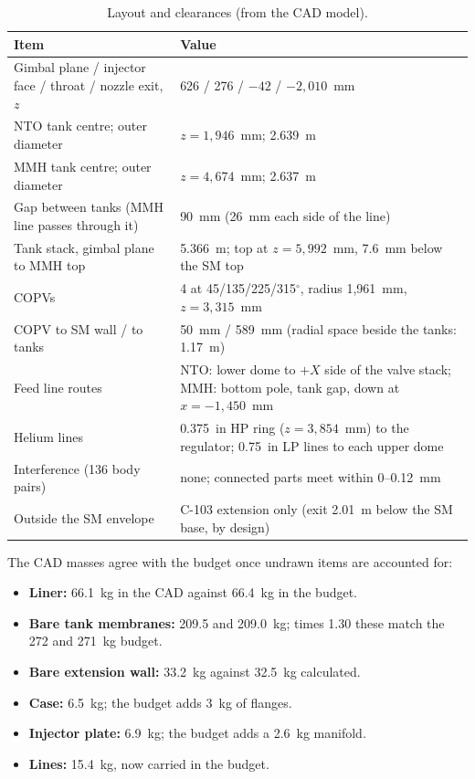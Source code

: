 \documentclass[10pt]{article}
\begin{document}
\begin{table}[H]\centering\small\caption{Layout and clearances (from the CAD model).}\label{tab:layout}
\begin{tabular}{p{4.6cm}p{11cm}}\toprule
Item & Value \\\midrule
Gimbal plane / injector face / throat / nozzle exit, $z$ & 626 / 276 / $-42$ / $-2{,}010$~mm \\
NTO tank centre; outer diameter & $z = 1{,}946$~mm; 2.639~m \\
MMH tank centre; outer diameter & $z = 4{,}674$~mm; 2.637~m \\
Gap between tanks (MMH line passes through it) & 90~mm (26~mm each side of the line) \\
Tank stack, gimbal plane to MMH top & 5.366~m; top at $z = 5{,}992$~mm, 7.6~mm below the SM top \\
COPVs & 4 at 45/135/225/315$^\circ$, radius 1{,}961~mm, $z = 3{,}315$~mm \\
COPV to SM wall / to tanks & 50~mm / 589~mm (radial space beside the tanks: 1.17~m) \\
Feed line routes & NTO: lower dome to $+X$ side of the valve stack; MMH: bottom pole, tank gap, down at $x = -1{,}450$~mm \\
Helium lines & 0.375~in HP ring ($z = 3{,}854$~mm) to the regulator; 0.75~in LP lines to each upper dome \\
Interference (136 body pairs) & none; connected parts meet within 0--0.12~mm \\
Outside the SM envelope & C-103 extension only (exit 2.01~m below the SM base, by design) \\
\bottomrule\end{tabular}\end{table}

The CAD masses agree with the budget once undrawn items are accounted for:
\begin{itemize}
\item \textbf{Liner:} 66.1~kg in the CAD against 66.4~kg in the budget.
\item \textbf{Bare tank membranes:} 209.5 and 209.0~kg; times 1.30 these match the 272 and 271~kg budget.
\item \textbf{Bare extension wall:} 33.2~kg against 32.5~kg calculated.
\item \textbf{Case:} 6.5~kg; the budget adds 3~kg of flanges.
\item \textbf{Injector plate:} 6.9~kg; the budget adds a 2.6~kg manifold.
\item \textbf{Lines:} 15.4~kg, now carried in the budget.
\end{itemize}
\end{document}
